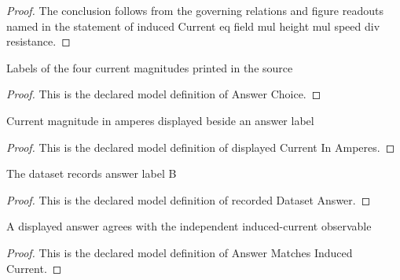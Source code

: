 \begin{proof}
  The conclusion follows from the governing relations and figure readouts named in the statement of induced Current eq field mul height mul speed div resistance.
\end{proof}
\begin{definition}
  \label{def:physics:phyx-mini-0973:phyxminiproblems-problemphyxmini0973-answerchoice}
  Labels of the four current magnitudes printed in the source
\end{definition}
\begin{proof}
  This is the declared model definition of Answer Choice.
\end{proof}
\begin{definition}
  \label{def:physics:phyx-mini-0973:phyxminiproblems-problemphyxmini0973-answerchoice-displayedcurrentinamperes}
  Current magnitude in amperes displayed beside an answer label
\end{definition}
\begin{proof}
  This is the declared model definition of displayed Current In Amperes.
\end{proof}
\begin{definition}
  \label{def:physics:phyx-mini-0973:phyxminiproblems-problemphyxmini0973-recordeddatasetanswer}
  The dataset records answer label B
\end{definition}
\begin{proof}
  This is the declared model definition of recorded Dataset Answer.
\end{proof}
\begin{definition}
  \label{def:physics:phyx-mini-0973:phyxminiproblems-problemphyxmini0973-answermatchesinducedcurrent}
  A displayed answer agrees with the independent induced-current observable
\end{definition}
\begin{proof}
  This is the declared model definition of Answer Matches Induced Current.
\end{proof}
